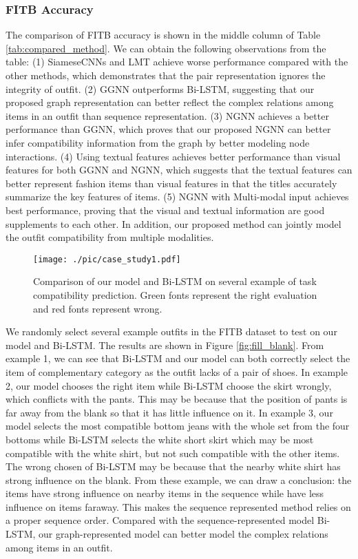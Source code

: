 \documentclass[sigconf]{acmart}
\begin{document}
\subsubsection {FITB Accuracy} \label{sect:fitb}
The comparison of FITB accuracy is shown in the middle column of Table \ref{tab:compared_method}. We can obtain the following observations from the table:
(1) SiameseCNNs and LMT achieve worse performance compared with the other methods, which demonstrates that the pair representation ignores the integrity of outfit. (2) GGNN outperforms Bi-LSTM, suggesting that our proposed graph representation can better reflect the complex relations among items in an outfit than sequence representation. (3) NGNN achieves a better performance than GGNN, which proves that our proposed NGNN can better infer compatibility information from the graph by better modeling node interactions.
(4) Using textual features achieves better performance than visual features for both GGNN and NGNN, which suggests that the textual features can better represent fashion items than visual features in that the titles accurately summarize the key features of items.
(5) NGNN with Multi-modal input achieves best performance, proving that the visual and textual information are good supplements to each other. In addition, our proposed method can jointly model the outfit compatibility from multiple modalities.
\begin{figure}[t]
  \centering
\texttt{[image: ./pic/case\_study1.pdf]}
  \caption{Comparison of our model and Bi-LSTM on several example of task compatibility prediction. Green fonts represent the right evaluation and red fonts represent wrong.}
  \label{fig:case_study}
\end{figure}
We randomly select several example outfits in the FITB dataset to test on our model and Bi-LSTM. The results are shown in Figure \ref{fig:fill_blank}.
From example 1, we can see that Bi-LSTM and our model can both correctly select the item of complementary category as the outfit lacks of a pair of shoes. In example 2, our model chooses the right item while Bi-LSTM choose the skirt wrongly, which conflicts with the pants. This may be because that the position of pants is far away from the blank so that it has little influence on it. In example 3, our model selects the most compatible bottom jeans with the whole set from the four bottoms while Bi-LSTM selects the white short skirt which may be most compatible with the white shirt, but not such compatible with the other items. The wrong chosen of Bi-LSTM may be because that the nearby white shirt has strong influence on the blank.
From these example, we can draw a conclusion: the items have strong influence on nearby items in the sequence while have less influence on items faraway. This makes the sequence represented method relies on a proper sequence order.
	Compared with the sequence-represented model Bi-LSTM, our graph-represented model can better model the complex relations among items in an outfit.
\end{document}
